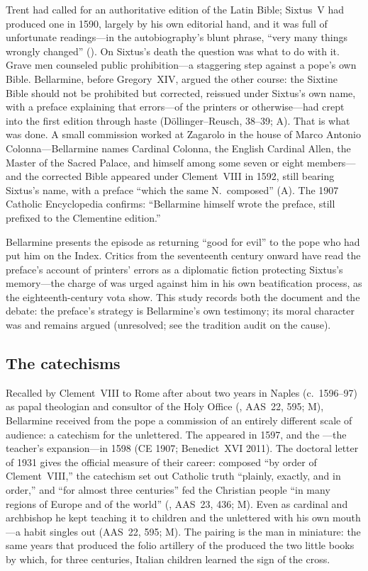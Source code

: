 Trent had called for an authoritative edition of the Latin Bible;
Sixtus~V had produced one in 1590, largely by his own editorial
hand, and it was full of unfortunate readings---in the
autobiography's blunt phrase, ``very many things wrongly changed''
(). On Sixtus's death the question
was what to do with it. Grave men counseled public prohibition---a
staggering step against a pope's own Bible. Bellarmine, before
Gregory~XIV, argued the other course: the Sixtine Bible should not
be prohibited but corrected, reissued under Sixtus's own name, with
a preface explaining that errors---of the printers or
otherwise---had crept into the first edition through haste
(D\"ollinger--Reusch, 38--39; A). That is what was done. A small
commission worked at Zagarolo in the house of Marco Antonio
Colonna---Bellarmine names Cardinal Colonna, the English Cardinal
Allen, the Master of the Sacred Palace, and himself among some
seven or eight members---and the corrected Bible appeared under
Clement~VIII in 1592, still bearing Sixtus's name, with a preface
``which the same N.\ composed'' (A). The 1907 Catholic
Encyclopedia confirms: ``Bellarmine himself wrote the preface,
still prefixed to the Clementine edition.''

Bellarmine presents the episode as returning ``good for evil'' to
the pope who had put him on the Index. Critics from the
seventeenth century onward have read the preface's account of
printers' errors as a diplomatic fiction protecting Sixtus's
memory---the charge of  was urged against him in
his own beatification process, as the eighteenth-century vota
show. This study records both the document and the debate: the
preface's strategy is Bellarmine's own testimony; its moral
character was and remains argued (unresolved; see the tradition
audit on the cause).

\subsection{The catechisms}

Recalled by Clement~VIII to Rome after about two years in Naples
(c.~1596--97) as papal theologian and consultor of the Holy Office
(, AAS~22, 595; M),
Bellarmine received from the pope a commission of an entirely
different scale of audience: a catechism for the unlettered. The
 appeared in 1597, and the
---the
teacher's expansion---in 1598 (CE 1907; Benedict~XVI 2011). The
doctoral letter of 1931 gives the official measure of their
career: composed ``by order of Clement~VIII,'' the catechism set
out Catholic truth ``plainly, exactly, and in order,'' and ``for
almost three centuries'' fed the Christian people ``in many
regions of Europe and of the world''
(, AAS~23, 436; M). Even as cardinal
and archbishop he kept teaching it to children and the unlettered
with his own mouth---a habit  singles out
(AAS~22, 595; M). The pairing is the man in miniature: the same
years that produced the folio artillery of the 
produced the two little books by which, for three centuries,
Italian children learned the sign of the cross.
